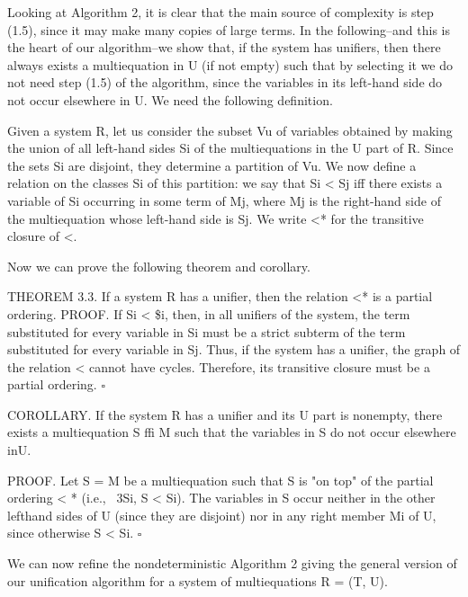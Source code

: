 
Looking at Algorithm 2, it is clear that the main source of complexity is step
(1.5), since it may make many copies of large terms. In the following--and this is
the heart of our algorithm--we show that, if the system has unifiers, then there
always exists a multiequation in U (if not empty) such that by selecting it we do
not need step (1.5) of the algorithm, since the variables in its left-hand side do
not occur elsewhere in U. We need the following definition. 

Given a system R, let us consider the subset Vu of variables obtained by making
the union of all left-hand sides Si of the multiequations in the U part of R. Since
the sets Si are disjoint, they determine a partition of Vu. We now define a relation
on the classes Si of this partition: we say that Si < Sj iff there exists a variable
of Si occurring in some term of Mj, where Mj is the right-hand side of
the multiequation whose left-hand side is Sj. We write <* for the transitive closure
of <. 

Now we can prove the following theorem and corollary. 

THEOREM 3.3. If a system R has a unifier, then the relation <* is a partial
ordering.
PROOF. If Si < \$i, then, in all unifiers of the system, the term substituted
for every variable in Si must be a strict subterm of the term substituted for every
variable in Sj. Thus, if the system has a unifier, the graph of the relation < cannot
have cycles. Therefore, its transitive closure must be a partial ordering.
$\square$

COROLLARY. If the system R has a unifier and its U part is nonempty, there
exists a multiequation S ffi M such that the variables in S do not occur elsewhere
inU.

PROOF. Let S = M be a multiequation such that S is "on top" of the partial
ordering < * (i.e., ~3Si, S < Si). The variables in S occur neither in the other lefthand
sides of U (since they are disjoint) nor in any right member Mi of U, since
otherwise S < Si. $\square$

We can now refine the nondeterministic Algorithm 2 giving the general version
of our unification algorithm for a system of multiequations R = (T, U). 

